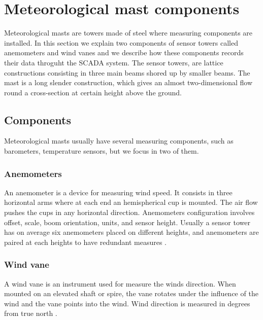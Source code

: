 \documentclass[journal]{IEEEtran}
\begin{document}
\section{Meteorological mast components}\label{sec:sensortower}
Meteorological masts are towers made of steel where measuring components are installed. In this section we explain two components of sensor towers called anemometers and wind vanes and we describe how these components records their data throguht the SCADA system.
The sensor towers, are  lattice constructions consisting in three main beams shored up by smaller beams. The mast is a long slender construction, which gives an almost two-dimensional flow round a cross-section at certain height above the ground. 

\subsection{Components}
Meteorological masts usually have several measuring components, such as barometers, temperature sensors, but we focus in two of them.
\subsubsection{Anemometers}
An anemometer is a device for measuring wind speed. It consists in three horizontal arms where at each end an hemispherical cup is mounted. The air flow pushes the cups in any horizontal direction. Anemometers configuration involves offset, scale, boom orientation, units, and sensor height. Usually a sensor tower has on average six anemometers placed on different heights, and  anemometers are paired at each heights to have redundant measures \cite{clifton2014135}.
\subsubsection{Wind vane}
A wind vane is an instrument used for measure the winds direction. When mounted on an elevated shaft or spire, the vane rotates under the influence of the wind and the vane points into the wind. Wind direction is measured in degrees from true north \cite{sayigh2012comprehensive}.
\end{document}
